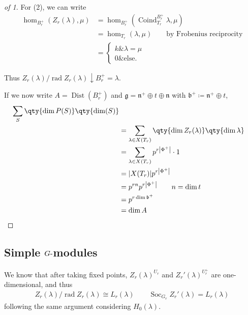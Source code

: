 \begin{proof}[of 1]
For (2), we can write
\begin{align*}  
\hom_{B_r^+}(Z_r(\lambda), \mu)
&= \hom_{B_r^+}(\operatorname{Coind}_{T_r}^{B_r^+} \lambda, \mu) \\
&= \hom_{T_r} (\lambda, \mu) \qquad\text{by Frobenius reciprocity} \\
&=
\begin{cases}
k \& \lambda = \mu \\
0 \& \text{else}.
\end{cases}
\end{align*}

Thus
\(Z_r(\lambda) / {\operatorname{rad}}Z_r(\lambda) \downarrow{B_r^+} = \lambda\).

If we now write \(A= \operatorname{Dist}(B_r^+)\) and
\({\mathfrak{g}}= {\mathfrak{n}}^+ \oplus t \oplus {\mathfrak{n}}\) with
\({\mathfrak{b}}^+ \coloneqq{\mathfrak{n}}^+ \oplus t\),
\begin{align*}
\sum_S \qty{\dim P(S)} \qty{\dim(S)} \\
&= \sum_{\lambda \in X(T_r)} \qty{\dim Z_r(\lambda)} \qty{\dim \lambda} \\
&= \sum_{\lambda \in X(T_r)} p^{r{\left\lvert {\Phi^+} \right\rvert}} \cdot 1 \\
&= {\left\lvert {X(T_r)} \right\rvert} p^{r{\left\lvert {\Phi^+} \right\rvert}} \\
&= p^{rn} p^{r{\left\lvert {\Phi^+} \right\rvert}} \qquad n = \dim t\\
&= p^{r \dim {\mathfrak{b}}^+} \\
&= \dim A
\end{align*}

\end{proof}

\hypertarget{simple-ghbox-modules}{%
\subsection{\texorpdfstring{Simple
\(G{\hbox{-}}\)modules}{Simple G\{\textbackslash hbox\{-\}\}modules}}\label{simple-ghbox-modules}}

We know that after taking fixed points, \(Z_r(\lambda)^{U_r}\) and
\(Z_r'(\lambda)^{U_r^+}\) are one-dimensional, and thus
\begin{align*}  
Z_r(\lambda) / {\operatorname{rad}}Z_r(\lambda) \cong L_r(\lambda) \qquad \operatorname{Soc}_{G_r} Z_r'(\lambda) = L_r(\lambda)
\end{align*}
following the same argument considering \(H_0(\lambda)\).

